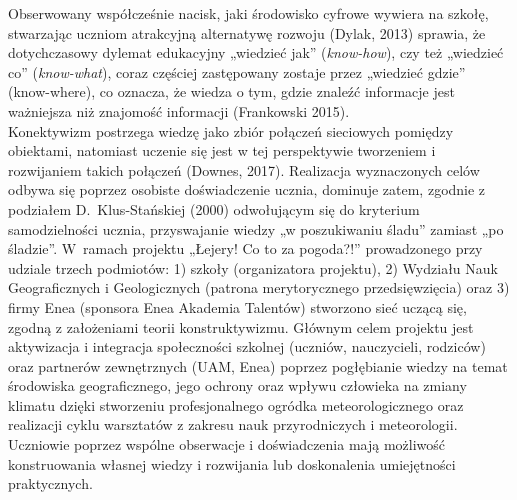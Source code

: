 \documentclass[\main/boa.tex]{subfiles}
\begin{document}
Obserwowany współcześnie nacisk, jaki środowisko cyfrowe wywiera na szkołę, stwarzając uczniom atrakcyjną alternatywę rozwoju (Dylak, 2013) sprawia, że dotychczasowy dylemat edukacyjny „wiedzieć jak” (\emph{know-how}), czy też „wiedzieć co” (\emph{know-what}), coraz częściej zastępowany zostaje przez „wiedzieć gdzie”  (know-where), co oznacza, że wiedza o tym, gdzie znaleźć informacje jest ważniejsza niż znajomość informacji (Frankowski 2015).\\
Konektywizm postrzega wiedzę jako zbiór połączeń sieciowych pomiędzy obiektami, natomiast uczenie się jest w tej perspektywie tworzeniem i rozwijaniem takich połączeń (Downes, 2017). Realizacja wyznaczonych celów odbywa się poprzez osobiste doświadczenie ucznia, dominuje zatem, zgodnie z podziałem D. Klus-Stańskiej (2000) odwołującym się do kryterium samodzielności ucznia, przyswajanie wiedzy „w poszukiwaniu śladu” zamiast „po śladzie”.  W ramach projektu „Łejery! Co to za pogoda?!” prowadzonego przy udziale trzech podmiotów: 1) szkoły (organizatora projektu), 2) Wydziału Nauk Geograficznych i Geologicznych (patrona merytorycznego przedsięwzięcia) oraz 3) firmy Enea (sponsora Enea Akademia Talentów) stworzono sieć uczącą się, zgodną z założeniami teorii konstruktywizmu. Głównym celem projektu jest aktywizacja i integracja społeczności szkolnej (uczniów, nauczycieli, rodziców) oraz partnerów zewnętrznych (UAM, Enea) poprzez pogłębianie wiedzy na temat środowiska geograficznego, jego ochrony oraz wpływu człowieka na zmiany klimatu dzięki stworzeniu profesjonalnego ogródka meteorologicznego oraz realizacji cyklu warsztatów z zakresu nauk przyrodniczych i meteorologii. Uczniowie poprzez wspólne obserwacje i doświadczenia mają możliwość konstruowania własnej wiedzy i rozwijania lub doskonalenia umiejętności praktycznych. 
\end{document}
